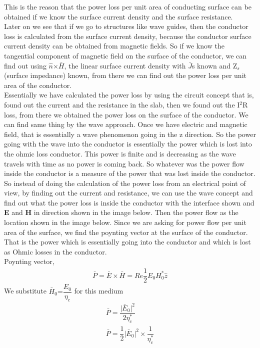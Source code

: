 This is the reason that the power loss per unit area of conducting surface can be obtained if we know the surface current density and the surface resistance.\\

Later on we see that if we go to structures like wave guides, then the conductor loss is calculated from the surface current density, because the conductor surface current density can be obtained from magnetic fields. So if we know the tangential component of magnetic field on the surface of the conductor, we can find out using $\hat{n}$$\times $$\bar{H}$, the linear surface current density with $\bar{J}$s known and Z$_{s}$(surface impedance) known, from there we can find out the power loss per unit area of the conductor.\\

Essentially we have calculated the power loss by using the circuit concept that is, found out the current and the resistance in the slab, then we found out the I$^{2}$R loss, from there we obtained the power loss on the surface of the conductor. We can find same thing by the wave approach. Once we have electric and magnetic field, that is essentially a wave phenomenon going in the z direction. So the power going with the wave into the conductor is essentially the power which is lost into the ohmic loss conductor. This power is finite and is decreasing as the wave travels with time as no power is coming back. So whatever was the power flow inside the conductor is a measure of the power that was lost inside the conductor. So instead of doing the calculation of the power loss from an electrical point of view, by finding out the current and resistance, we can use the wave concept and find out what the power loss is inside the conductor with the interface shown and \textbf{E} and \textbf{H} in direction shown in the image below. Then the power flow as the location shown in the image below. Since we are asking for power flow per unit area of the surface, we find the poynting vector at the surface of the conductor. That is the power which is essentially going into the conductor and which is lost as Ohmic losses in the conductor.\\
Poynting vector,
\begin{align}
\bar{P}=\bar{E}\times \bar{H}=Re\dfrac{1}{2}E_{0}H_{0}^{\ast}\hat{z}
\end{align}
We substitute $\bar{H}$$_{0}$=$\dfrac{E_{0}}{\eta_{c}}$ for this medium
\begin{align}
\bar{P}=\dfrac{\lvert\bar{E}_{0}\rvert^{2}}{2\eta_{c}^{\ast}}\\
\bar{P}=\dfrac{1}{2}\lvert\bar{E}_{0}\rvert^{2}\times \dfrac{1}{\eta_{c}^{\ast}}
\end{align}

